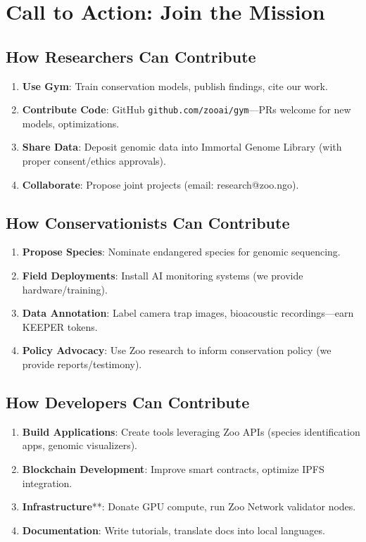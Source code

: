 \section{Call to Action: Join the Mission}


\subsection{How Researchers Can Contribute}

\begin{enumerate}
    \item \textbf{Use Gym}: Train conservation models, publish findings, cite our work.
    \item \textbf{Contribute Code}: GitHub \texttt{github.com/zooai/gym}—PRs welcome for new models, optimizations.
    \item \textbf{Share Data}: Deposit genomic data into Immortal Genome Library (with proper consent/ethics approvals).
    \item \textbf{Collaborate}: Propose joint projects (email: research@zoo.ngo).
\end{enumerate}

\subsection{How Conservationists Can Contribute}

\begin{enumerate}
    \item \textbf{Propose Species}: Nominate endangered species for genomic sequencing.
    \item \textbf{Field Deployments}: Install AI monitoring systems (we provide hardware/training).
    \item \textbf{Data Annotation}: Label camera trap images, bioacoustic recordings—earn KEEPER tokens.
    \item \textbf{Policy Advocacy}: Use Zoo research to inform conservation policy (we provide reports/testimony).
\end{enumerate}

\subsection{How Developers Can Contribute}

\begin{enumerate}
    \item \textbf{Build Applications}: Create tools leveraging Zoo APIs (species identification apps, genomic visualizers).
    \item \textbf{Blockchain Development}: Improve smart contracts, optimize IPFS integration.
    \item \textbf{Infrastructure}**: Donate GPU compute, run Zoo Network validator nodes.
    \item \textbf{Documentation}: Write tutorials, translate docs into local languages.
\end{enumerate}

